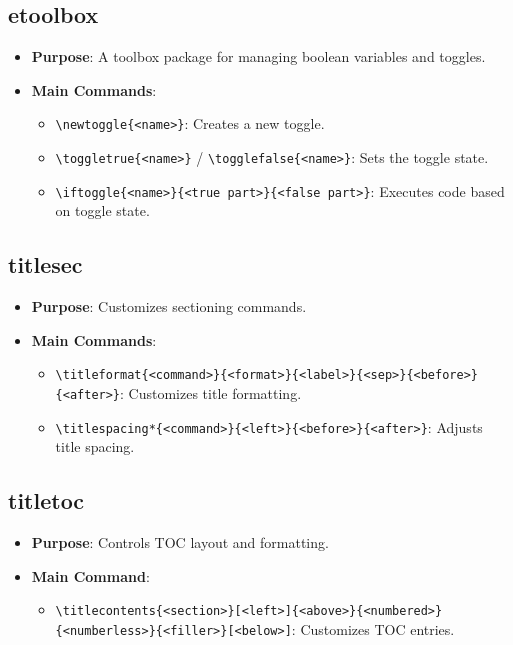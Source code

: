 \documentclass[12pt,twoside]{report}
\begin{document}
\subsection{etoolbox}
\begin{itemize}
    \item \textbf{Purpose}: A toolbox package for managing boolean variables and toggles.
    \item \textbf{Main Commands}:
    \begin{itemize}
        \item \verb|\newtoggle{<name>}|: Creates a new toggle.
        \item \verb|\toggletrue{<name>}| / \verb|\togglefalse{<name>}|: Sets the toggle state.
        \item \verb|\iftoggle{<name>}{<true part>}{<false part>}|: Executes code based on toggle state.
    \end{itemize}
\end{itemize}

\subsection{titlesec}
\begin{itemize}
    \item \textbf{Purpose}: Customizes sectioning commands.
    \item \textbf{Main Commands}:
    \begin{itemize}
        \item \verb|\titleformat{<command>}{<format>}{<label>}|\br \verb|{<sep>}{<before>}{<after>}|: Customizes title formatting.
        \item \verb|\titlespacing*{<command>}{<left>}{<before>}{<after>}|: Adjusts title spacing.
    \end{itemize}
\end{itemize}

\subsection{titletoc}
\begin{itemize}
    \item \textbf{Purpose}: Controls TOC layout and formatting.
    \item \textbf{Main Command}:
    \begin{itemize}
        \item \verb|\titlecontents{<section>}[<left>]{<above>}|\br\verb|{<numbered>}{<numberless>}{<filler>}[<below>]|: Customizes TOC entries.
    \end{itemize}
\end{itemize}
\end{document}
